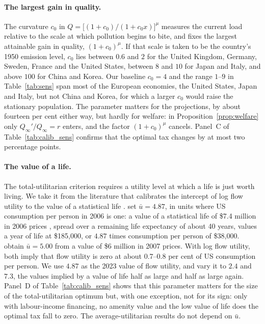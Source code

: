 \documentclass[11pt]{article}
\begin{document}
\paragraph{The largest gain in quality.}
The curvature $c_0$ in $Q=\big[(1+c_0)/(1+c_0x)\big]^{\mu}$ measures the current load relative to the
scale at which pollution begins to bite, and fixes the largest attainable gain in quality,
$(1+c_0)^{\mu}$. If that scale is taken to be the country's 1950 emission level, $c_0$ lies between $0.6$
and $2$ for the United Kingdom, Germany, Sweden, France and the United States, between $8$ and $10$ for Japan and
Italy, and above $100$ for China and Korea. Our baseline $c_0=4$ and the range $1$--$9$ in
Table~\ref{tab:sens} span most of the European economies, the United States, Japan and Italy, but not
China and Korea, for which a larger $c_0$ would raise the stationary population. The parameter matters for the projections, by about
fourteen per cent either way, but hardly for welfare: in Proposition~\ref{prop:welfare} only
$Q_\infty'/Q_\infty=r$ enters, and the factor $(1+c_0)^{\mu}$ cancels. Panel~C of
Table~\ref{tab:calib_sens} confirms that the optimal tax changes by at most two percentage points.

\paragraph{The value of a life.}
The total-utilitarian criterion requires a utility level at which a life is just worth living. We take it
from the literature that calibrates the intercept of log flow utility to the value of a statistical life
\citep{jonesklenow2016,adhami2024}. \citet{adhami2024} set $\bar u=4.87$, in units where US consumption per person in 2006 is
one: a value of a statistical life of \$7.4 million in 2006 prices \citep[the figure used by the US
Environmental Protection Agency; see][]{adhami2024}, spread over a remaining life expectancy of about 40
years, values a year of life at \$185{,}000, or $4.87$ times consumption per person of \$38{,}000.
\citet{jonesklenow2016} obtain $\bar u=5.00$ from a value of \$6 million in 2007 prices. With log flow
utility, both imply that flow utility is zero at about 0.7--0.8 per cent of US consumption per person. We use $4.87$ as the 2023 value of flow utility, and vary it to $2.4$ and $7.3$, the values implied by a value of life half
as large and half as large again. Panel~D of Table~\ref{tab:calib_sens}
shows that this parameter matters for the size of the total-utilitarian optimum but, with one exception,
not for its sign: only with labour-income financing, no amenity value and the low value of life does the
optimal tax fall to zero. The average-utilitarian results do not depend on $\bar u$.
\end{document}
